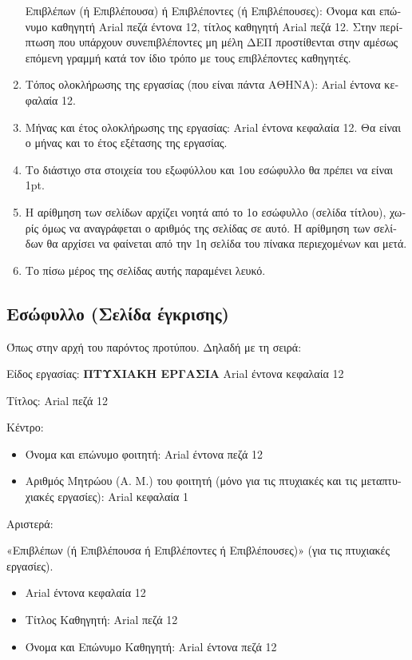 \documentclass[inscr,ack,preface]{dithesis}
\begin{document}
\begin{greek}
\begin{enumerate}
            Επιβλέπων (ή Επιβλέπουσα) ή Επιβλέποντες (ή Επιβλέπουσες): Όνομα και επώνυμο καθηγητή Arial πεζά έντονα 12, τίτλος καθηγητή Arial πεζά 12. Στην περίπτωση που υπάρχουν συνεπιβλέποντες μη μέλη ΔΕΠ προστίθενται στην αμέσως επόμενη γραμμή κατά τον ίδιο τρόπο με τους επιβλέποντες καθηγητές.
      \item Τόπος ολοκλήρωσης της εργασίας (που είναι πάντα ΑΘΗΝΑ): Arial έντονα κεφαλαία 12.
      \item Μήνας και έτος ολοκλήρωσης της εργασίας: Arial έντονα κεφαλαία 12. Θα είναι ο μήνας και το έτος εξέτασης της εργασίας.
      \item Το διάστιχο στα στοιχεία του εξωφύλλου και 1ου εσώφυλλο θα πρέπει να είναι 1pt.
      \item Η αρίθμηση των σελίδων αρχίζει νοητά από το 1ο εσώφυλλο (σελίδα τίτλου), χωρίς όμως να αναγράφεται ο αριθμός της σελίδας σε αυτό. Η αρίθμηση των σελίδων θα αρχίσει να φαίνεται από την 1η σελίδα του πίνακα περιεχομένων και μετά.
      \item Το πίσω μέρος της σελίδας αυτής παραμένει λευκό.
    \end{enumerate}

    \subsection{ Εσώφυλλο (Σελίδα έγκρισης)}
    Όπως στην αρχή του παρόντος προτύπου. Δηλαδή με τη σειρά:

    Είδος εργασίας: \textbf{ΠΤΥΧΙΑΚΗ ΕΡΓΑΣΙΑ} Arial έντονα κεφαλαία 12

    Τίτλος: Arial πεζά 12

    Κέντρο:
    \begin{itemize}
      \item Όνομα και επώνυμο φοιτητή: Arial έντονα πεζά 12
      \item Αριθμός Μητρώου (Α. Μ.) του φοιτητή (μόνο για τις πτυχιακές και τις μεταπτυχιακές εργασίες): Arial κεφαλαία 1
    \end{itemize}

    Αριστερά:

    «Επιβλέπων (ή Επιβλέπουσα ή Επιβλέποντες ή Επιβλέπουσες)» (για τις πτυχιακές εργασίες).
    \begin{itemize}
      \item Arial έντονα κεφαλαία 12
      \item Τίτλος Καθηγητή: Arial πεζά 12
      \item Όνομα και Επώνυμο Καθηγητή: Arial έντονα πεζά 12
    \end{itemize}


\end{greek}
\end{document}
